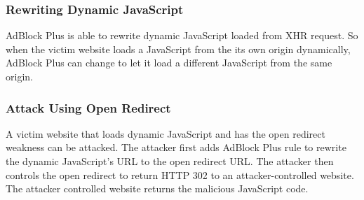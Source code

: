 \documentclass[conference]{IEEEtran}
\begin{document}
\subsubsection{Rewriting Dynamic JavaScript}

AdBlock Plus is able to rewrite dynamic JavaScript loaded from XHR request. So when the victim website loads a JavaScript from the its own origin dynamically, AdBlock Plus can change to let it load a different JavaScript from the same origin.

\subsubsection{Attack Using Open Redirect}

A victim website that loads dynamic JavaScript and has the open redirect weakness can be attacked. The attacker first adds AdBlock Plus rule to rewrite the dynamic JavaScript's URL to the open redirect URL. The attacker then controls the open redirect to return HTTP 302 to an attacker-controlled website. The attacker controlled website returns the malicious JavaScript code.
\end{document}
